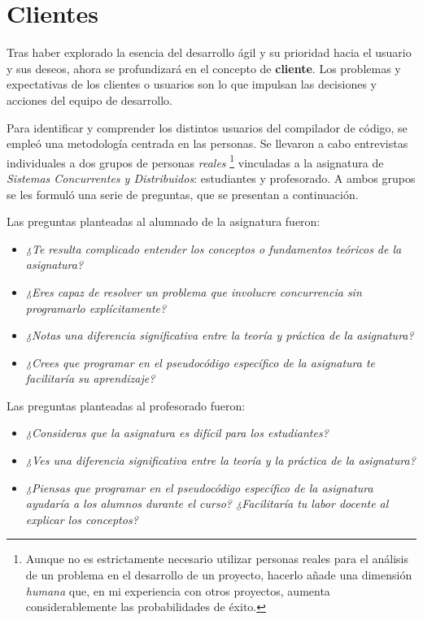 \section{Clientes}
Tras haber explorado la esencia del desarrollo ágil y su prioridad hacia el usuario y sus deseos, ahora se profundizará en el concepto de \textbf{cliente}. Los problemas y expectativas de los clientes o usuarios son lo que impulsan las decisiones y acciones del equipo de desarrollo. 

Para identificar y comprender los distintos usuarios del compilador de código, se empleó una metodología centrada en las personas. Se llevaron a cabo entrevistas individuales a dos grupos de personas \textit{reales} \footnote{Aunque no es estrictamente necesario utilizar personas reales para el análisis de un problema en el desarrollo de un proyecto, hacerlo añade una dimensión \textit{humana} que, en mi experiencia con otros proyectos, aumenta considerablemente las probabilidades de éxito.} vinculadas a la asignatura de \textit{Sistemas Concurrentes y Distribuidos}: estudiantes y profesorado. A ambos grupos se les formuló una serie de preguntas, que se presentan a continuación.

\noindent
Las preguntas planteadas al alumnado de la asignatura fueron:
\begin{itemize}
    \item \textit{¿Te resulta complicado entender los conceptos o fundamentos teóricos de la asignatura?}
    \item \textit{¿Eres capaz de resolver un problema que involucre concurrencia sin programarlo explícitamente?}
    \item \textit{¿Notas una diferencia significativa entre la teoría y práctica de la asignatura?}
    \item \textit{¿Crees que programar en el pseudocódigo específico de la asignatura te facilitaría su aprendizaje?}
\end{itemize}

\noindent
Las preguntas planteadas al profesorado fueron:
\begin{itemize}
    \item \textit{¿Consideras que la asignatura es difícil para los estudiantes?}
    \item \textit{¿Ves una diferencia significativa entre la teoría y la práctica de la asignatura?}
    \item \textit{¿Piensas que programar en el pseudocódigo específico de la asignatura ayudaría a los alumnos durante el curso? ¿Facilitaría tu labor docente al explicar los conceptos?}
\end{itemize}

